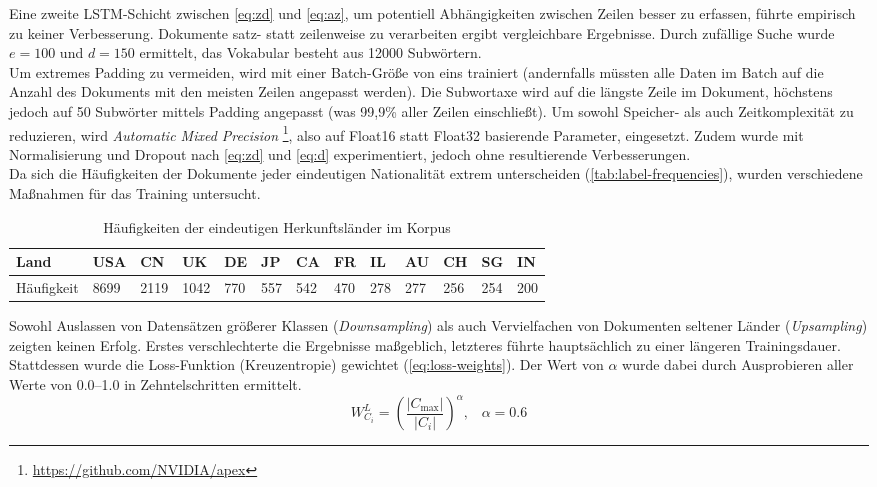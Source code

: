 \documentclass[bachelor,german]{info1thesis}
\begin{document}
Eine zweite LSTM-Schicht zwischen \autoref{eq:zd} und \ref{eq:az}, um potentiell Abhängigkeiten zwischen Zeilen besser zu erfassen, führte empirisch zu keiner Verbesserung. Dokumente satz- statt zeilenweise zu verarbeiten ergibt vergleichbare Ergebnisse. Durch zufällige Suche wurde $e = 100$ und $d = 150$ ermittelt, das Vokabular besteht aus 12000 Subwörtern. \\
Um extremes Padding zu vermeiden, wird mit einer Batch-Größe von eins trainiert (andernfalls müssten alle Daten im Batch auf die Anzahl des Dokuments mit den meisten Zeilen angepasst werden). Die Subwortaxe wird auf die längste Zeile im Dokument, höchstens jedoch auf 50 Subwörter mittels Padding angepasst (was 99,9\% aller Zeilen einschließt). Um sowohl Speicher- als auch Zeitkomplexität zu reduzieren, wird \textit{Automatic Mixed Precision} \footnote{\url{https://github.com/NVIDIA/apex}}, also auf Float16 statt Float32 basierende Parameter, eingesetzt.
Zudem wurde mit Normalisierung und Dropout nach \autoref{eq:zd} und \ref{eq:d} experimentiert, jedoch ohne resultierende Verbesserungen. \\
Da sich die Häufigkeiten der Dokumente jeder eindeutigen Nationalität extrem unterscheiden (\autoref{tab:label-frequencies}), wurden verschiedene Maßnahmen für das Training untersucht.
%
\begin{table}[h!]
\begin{tabular}{@{}lllllllllllll@{}}
Land       & USA  & CN   & UK   & DE  & JP  & CA  & FR  & IL  & AU  & CH  & SG  & IN  \\ \midrule
Häufigkeit & 8699 & 2119 & 1042 & 770 & 557 & 542 & 470 & 278 & 277 & 256 & 254 & 200 \\ %
\end{tabular}
\caption{Häufigkeiten der eindeutigen Herkunftsländer im Korpus}
\label{tab:label-frequencies}
\end{table}
%
Sowohl Auslassen von Datensätzen größerer Klassen (\textit{Downsampling}) als auch Vervielfachen von Dokumenten seltener Länder (\textit{Upsampling}) zeigten keinen Erfolg. Erstes verschlechterte die Ergebnisse maßgeblich, letzteres führte hauptsächlich zu einer längeren Trainingsdauer. Stattdessen wurde die Loss-Funktion (Kreuzentropie) gewichtet (\autoref{eq:loss-weights}). Der Wert von $\alpha$ wurde dabei durch Ausprobieren aller Werte von 0.0--1.0 in Zehntelschritten ermittelt.
%
\begin{equation}
W_{C_i}^L = \left(\frac{|C_{\max}|}{|C_i|}\right)^\alpha,\;\;\;\alpha = 0.6 \label{eq:loss-weights}
\end{equation}
\end{document}
